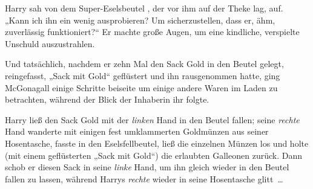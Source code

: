 Harry sah von dem Super-Eselsbeutel , der vor ihm auf der Theke lag, auf. „Kann ich ihn ein wenig ausprobieren? Um sicherzustellen, dass er, ähm, zuverlässig funktioniert?“ Er machte große Augen, um eine kindliche, verspielte Unschuld auszustrahlen.

Und tatsächlich, nachdem er zehn Mal den Sack Gold in den Beutel gelegt, reingefasst, „Sack mit Gold“ geflüstert und ihn rausgenommen hatte, ging McGonagall einige Schritte beiseite um einige andere Waren im Laden zu betrachten, während der Blick der Inhaberin ihr folgte.

Harry ließ den Sack Gold mit der \emph{linken} Hand in den Beutel fallen; seine \emph{rechte} Hand wanderte mit einigen fest umklammerten Goldmünzen aus seiner Hosentasche, fasste in den Eselsfellbeutel, ließ die einzelnen Münzen los und holte (mit einem geflüsterten „Sack mit Gold“) die erlaubten Galleonen zurück. Dann schob er diesen Sack in seine \emph{linke} Hand, um ihn gleich wieder in den Beutel fallen zu lassen, während Harrys \emph{rechte} wieder in seine Hosentasche glitt …

